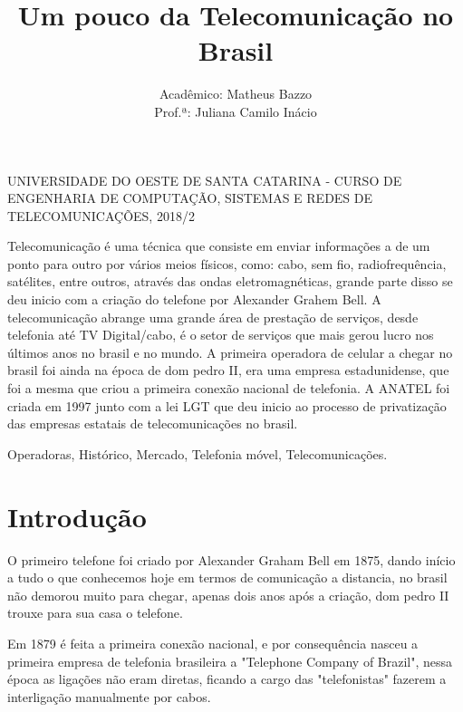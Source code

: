 \documentclass{sbrt2018port}
\begin{document}
\title{Um pouco da Telecomunicação no Brasil}

\author{ Acadêmico: Matheus Bazzo \\
Prof.ª: Juliana Camilo Inácio}

\maketitle

 {UNIVERSIDADE DO OESTE DE SANTA CATARINA - CURSO DE ENGENHARIA DE COMPUTAÇÃO, SISTEMAS E REDES DE TELECOMUNICAÇÕES, 2018/2}

\begin{resumo}
Telecomunicação é uma técnica que consiste em enviar informações a de um ponto para outro por vários meios físicos, como: cabo, sem fio, radiofrequência, satélites, entre outros, através das ondas eletromagnéticas, grande parte disso se deu inicio com a criação do telefone por Alexander Grahem Bell.
A telecomunicação abrange uma grande área de prestação de serviços, desde telefonia até TV Digital/cabo, é o setor de serviços que mais gerou lucro nos últimos anos no brasil e no mundo.
A primeira operadora de celular a chegar no brasil foi ainda na época de dom pedro II, era uma empresa estadunidense, que foi a mesma que criou a primeira conexão nacional de telefonia.
A ANATEL foi criada em 1997 junto com a lei LGT que deu inicio ao processo de privatização das empresas estatais de telecomunicações no brasil.
\end{resumo}

\begin{chave}
Operadoras, Histórico, Mercado, Telefonia móvel, Telecomunicações.
\end{chave}

\section{Introdução}

O primeiro telefone foi criado por Alexander Graham Bell em 1875, dando início a tudo o que conhecemos hoje em termos de comunicação a distancia, no brasil não demorou muito para chegar, apenas dois anos após a criação, dom pedro II trouxe para sua casa o telefone.

Em 1879 é feita a primeira conexão nacional, e por consequência nasceu a primeira empresa de telefonia brasileira a "Telephone Company of Brazil", nessa época as ligações não eram diretas, ficando a cargo das "telefonistas" fazerem a interligação manualmente por cabos.
\end{document}
